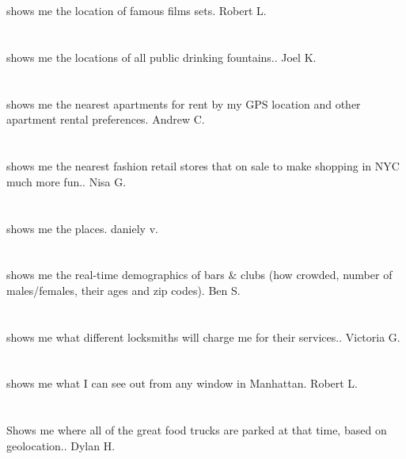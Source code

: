 \section{}shows me the location of famous films sets. Robert L.
\section{}shows me the locations of all public drinking fountains.. Joel K.
\section{}shows me the nearest apartments for rent by my GPS location and other apartment rental preferences. Andrew C.
\section{}shows me the nearest fashion retail stores that on sale to make shopping in NYC much more fun.. Nisa G.
\section{}shows me the places. daniely v.
\section{} shows me the real-time demographics of bars \& clubs (how crowded,  number of males/females,  their ages and zip codes). Ben  S.
\section{}shows me what different locksmiths will charge me for their services.. Victoria G.
\section{} shows me what I can see out from any window in Manhattan. Robert L.
\section{}Shows me where all of the great food trucks are parked at that time,  based on geolocation.. Dylan H.

